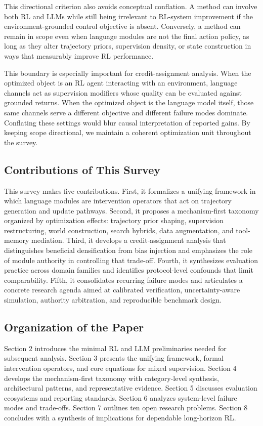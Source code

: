 ﻿\documentclass[conference]{IEEEtran}
\begin{document}
This directional criterion also avoids conceptual conflation. A method can involve both RL and LLMs while still being irrelevant to RL-system improvement if the environment-grounded control objective is absent. Conversely, a method can remain in scope even when language modules are not the final action policy, as long as they alter trajectory priors, supervision density, or state construction in ways that measurably improve RL performance.

This boundary is especially important for credit-assignment analysis. When the optimized object is an RL agent interacting with an environment, language channels act as supervision modifiers whose quality can be evaluated against grounded returns. When the optimized object is the language model itself, those same channels serve a different objective and different failure modes dominate. Conflating these settings would blur causal interpretation of reported gains. By keeping scope directional, we maintain a coherent optimization unit throughout the survey.

\subsection{Contributions of This Survey}
This survey makes five contributions. First, it formalizes a unifying framework in which language modules are intervention operators that act on trajectory generation and update pathways. Second, it proposes a mechanism-first taxonomy organized by optimization effects: trajectory prior shaping, supervision restructuring, world construction, search hybrids, data augmentation, and tool-memory mediation. Third, it develops a credit-assignment analysis that distinguishes beneficial densification from bias injection and emphasizes the role of module authority in controlling that trade-off. Fourth, it synthesizes evaluation practice across domain families and identifies protocol-level confounds that limit comparability. Fifth, it consolidates recurring failure modes and articulates a concrete research agenda aimed at calibrated verification, uncertainty-aware simulation, authority arbitration, and reproducible benchmark design.

\subsection{Organization of the Paper}
Section 2 introduces the minimal RL and LLM preliminaries needed for subsequent analysis. Section 3 presents the unifying framework, formal intervention operators, and core equations for mixed supervision. Section 4 develops the mechanism-first taxonomy with category-level synthesis, architectural patterns, and representative evidence. Section 5 discusses evaluation ecosystems and reporting standards. Section 6 analyzes system-level failure modes and trade-offs. Section 7 outlines ten open research problems. Section 8 concludes with a synthesis of implications for dependable long-horizon RL.
\end{document}
